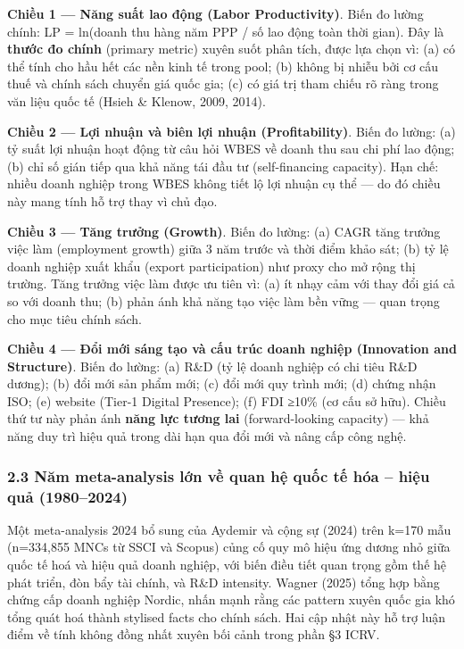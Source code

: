 \documentclass[12pt,a4paper]{article}
\begin{document}
\textbf{Chiều 1 --- Năng suất lao động (Labor Productivity)}. Biến đo
lường chính: LP = ln(doanh thu hàng năm PPP / số lao động toàn thời
gian). Đây là \textbf{thước đo chính} (primary metric) xuyên suốt phân
tích, được lựa chọn vì: (a) có thể tính cho hầu hết các nền kinh tế
trong pool; (b) không bị nhiễu bởi cơ cấu thuế và chính sách chuyển giá
quốc gia; (c) có giá trị tham chiếu rõ ràng trong văn liệu quốc tế
(Hsieh \& Klenow, 2009, 2014).

\textbf{Chiều 2 --- Lợi nhuận và biên lợi nhuận (Profitability)}. Biến
đo lường: (a) tỷ suất lợi nhuận hoạt động từ câu hỏi WBES về doanh thu
sau chi phí lao động; (b) chỉ số gián tiếp qua khả năng tái đầu tư
(self-financing capacity). Hạn chế: nhiều doanh nghiệp trong WBES không
tiết lộ lợi nhuận cụ thể --- do đó chiều này mang tính hỗ trợ thay vì
chủ đạo.

\textbf{Chiều 3 --- Tăng trưởng (Growth)}. Biến đo lường: (a) CAGR tăng
trưởng việc làm (employment growth) giữa 3 năm trước và thời điểm khảo
sát; (b) tỷ lệ doanh nghiệp xuất khẩu (export participation) như proxy
cho mở rộng thị trường. Tăng trưởng việc làm được ưu tiên vì: (a) ít
nhạy cảm với thay đổi giá cả so với doanh thu; (b) phản ánh khả năng tạo
việc làm bền vững --- quan trọng cho mục tiêu chính sách.

\textbf{Chiều 4 --- Đổi mới sáng tạo và cấu trúc doanh nghiệp
(Innovation and Structure)}. Biến đo lường: (a) R\&D (tỷ lệ doanh nghiệp
có chi tiêu R\&D dương); (b) đổi mới sản phẩm mới; (c) đổi mới quy trình
mới; (d) chứng nhận ISO; (e) website (Tier-1 Digital Presence); (f) FDI
≥10\% (cơ cấu sở hữu). Chiều thứ tư này phản ánh \textbf{năng lực tương
lai} (forward-looking capacity) --- khả năng duy trì hiệu quả trong dài
hạn qua đổi mới và nâng cấp công nghệ.

\hypertarget{23-nux103m-meta-analysis-lux1edbn-vux1ec1-quan-hux1ec7-quux1ed1c-tux1ebf-huxf3a--hiux1ec7u-quux1ea3-19802024}{%
\subsubsection{2.3 Năm meta-analysis lớn về quan hệ quốc tế hóa -- hiệu
quả
(1980--2024)}\label{23-nux103m-meta-analysis-lux1edbn-vux1ec1-quan-hux1ec7-quux1ed1c-tux1ebf-huxf3a--hiux1ec7u-quux1ea3-19802024}}

Một meta-analysis 2024 bổ sung của Aydemir và cộng sự (2024) trên k=170
mẫu (n=334,855 MNCs từ SSCI và Scopus) củng cố quy mô hiệu ứng dương nhỏ
giữa quốc tế hoá và hiệu quả doanh nghiệp, với biến điều tiết quan trọng
gồm thế hệ phát triển, đòn bẩy tài chính, và R\&D intensity. Wagner
(2025) tổng hợp bằng chứng cấp doanh nghiệp Nordic, nhấn mạnh rằng các
pattern xuyên quốc gia khó tổng quát hoá thành stylised facts cho chính
sách. Hai cập nhật này hỗ trợ luận điểm về tính không đồng nhất xuyên
bối cảnh trong phần §3 ICRV.
\end{document}
